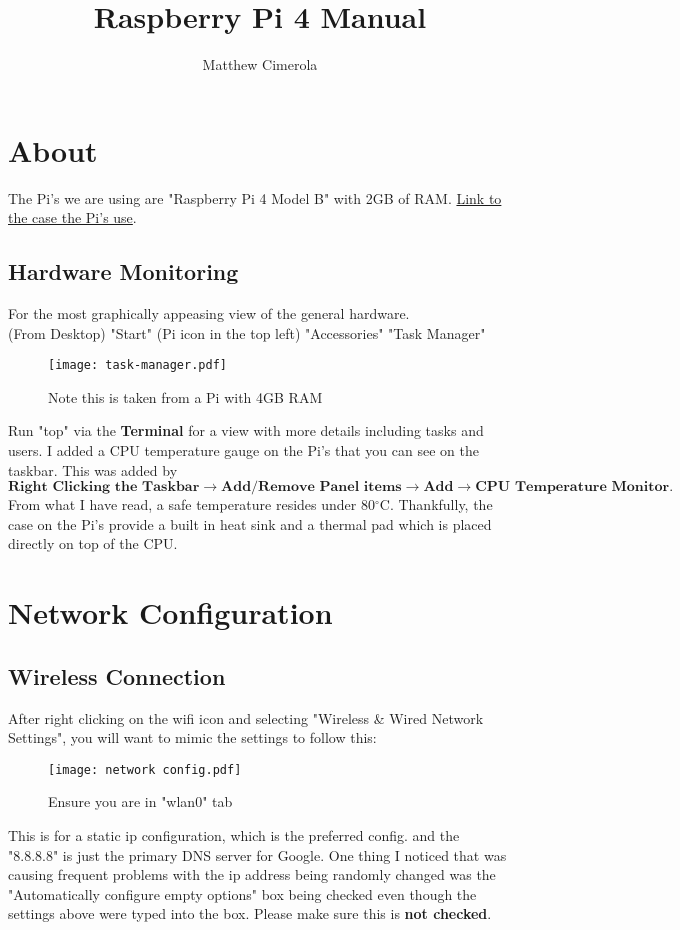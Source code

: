 \documentclass[12pt]{extarticle}
\author{Matthew Cimerola}
\title{Raspberry Pi 4 Manual}
\begin{document}
\maketitle

\tableofcontents
\newpage
\section{About}
The Pi's we are using are "Raspberry Pi 4 Model B" with 2GB of RAM. \href{https://www.amazon.com/Flirc-Raspberry-Pi-Case-Silver/dp/B07WG4DW52/ref=sr_1_5?keywords=Raspberry+Pi+4+Case&qid=1658852531&sr=8-5}{Link to the case the Pi's use}. 
\subsection{Hardware Monitoring}
For the most graphically appeasing view of the general hardware.\\ 
(From Desktop) "Start" (Pi icon in the top left) \rightarrow "Accessories" \rightarrow "Task Manager" 

\begin{figure}[ht]
    \centering
    \texttt{[image: task-manager.pdf]}
    \caption{Note this is taken from a Pi with 4GB RAM}
\end{figure}
Run "top" via the \textbf{Terminal} for a view with more details including tasks and users. I added a CPU temperature gauge on the Pi's that you can see on the taskbar. This was added by $ \textbf{Right Clicking the Taskbar} \rightarrow \textbf{Add/Remove Panel items} \rightarrow \textbf{Add} \rightarrow \textbf{CPU Temperature Monitor}. $ From what I have read, a safe temperature resides under 80$^{\circ}$C. Thankfully, the case on the Pi's provide a built in heat sink and a thermal pad which is placed directly on top of the CPU.


\newpage
\section{Network Configuration}
\subsection{Wireless Connection}
After right clicking on the wifi icon and selecting "Wireless \& Wired Network Settings", you will want to mimic the settings to follow this:
\begin{figure}[ht]
    \centering
    \texttt{[image: network config.pdf]}
    \caption{Ensure you are in "wlan0" tab}
\end{figure}
\newline This is for a static ip configuration, which is the preferred config. and the "8.8.8.8" is just the primary DNS server for Google. One thing I noticed that was causing frequent problems with the ip address being randomly changed was the "Automatically configure empty options" box being checked even though the settings above were typed into the box. Please make sure this is \textbf{not checked}.
\end{document}
